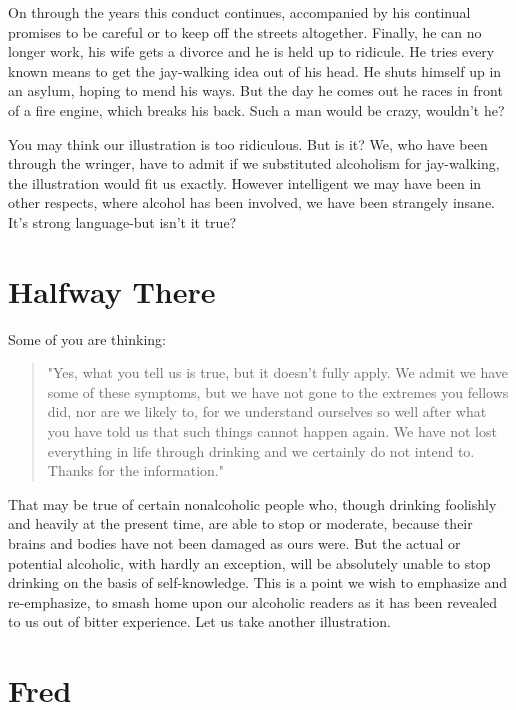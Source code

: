 On through the years this conduct continues, 
accompanied by his continual promises to be careful 
or to keep off the streets altogether. 
Finally, he can no longer work, 
his wife gets a divorce and he is held up to ridicule. 
He tries every known means to get the jay-walking idea out of his head. 
He shuts himself up in an asylum, hoping to mend his ways. 
But the day he comes out he races in front of a fire engine, 
which breaks his back. 
Such a man would be crazy, wouldn't he?

You may think our illustration is too ridiculous. 
But is it? 
We, who have been through the wringer, 
have to admit if we substituted alcoholism for jay-walking, 
the illustration would fit us exactly. 
However intelligent we may have been in other respects, 
where alcohol has been involved, we have been strangely insane. 
It's strong language-but isn't it true?


\section{Halfway There}

Some of you are thinking: 
\begin{quote}
"Yes, what you tell us is true, but it doesn't fully apply. 
We admit we have some of these symptoms, 
but we have not gone to the extremes you fellows did, 
nor are we likely to, 
for we understand ourselves so well after what you have told us 
that such things cannot happen again. 
We have not lost everything in life through drinking and we certainly do not intend to. 
Thanks for the information."
\end{quote}

That may be true of certain nonalcoholic people who, 
though drinking foolishly and heavily at the present time, 
are able to stop or moderate, 
because their brains and bodies have not been damaged as ours were. 
But the actual or potential alcoholic, with hardly an exception, 
will be absolutely unable to stop drinking on the basis of self-knowledge. 
This is a point we wish to emphasize and re-emphasize, 
to smash home upon our alcoholic readers 
as it has been revealed to us out of bitter experience. 
Let us take another illustration.


\section{Fred}

